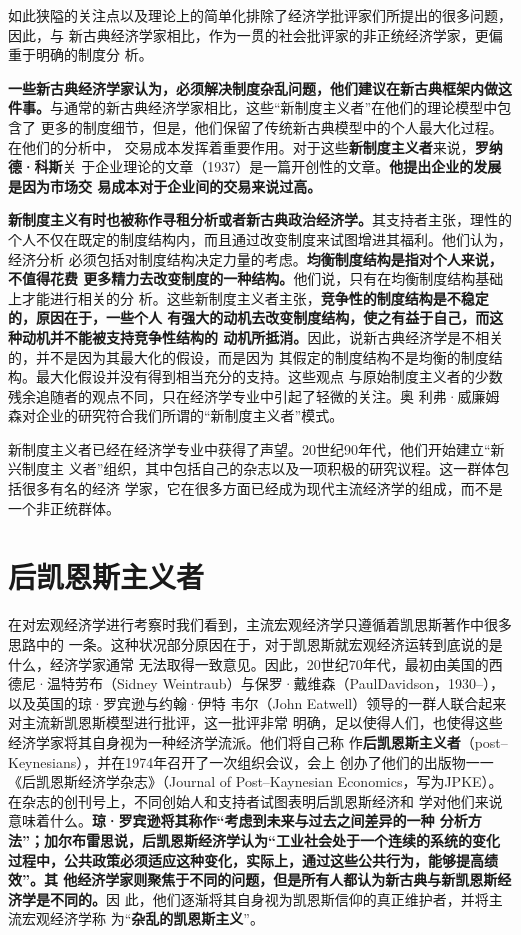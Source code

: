 如此狭隘的关注点以及理论上的简单化排除了经济学批评家们所提出的很多问题，因此，与
新古典经济学家相比，作为一贯的社会批评家的非正统经济学家，更偏重于明确的制度分
析。

\textbf{一些新古典经济学家认为，必须解决制度杂乱问题，他们建议在新古典框架内做这
  件事。}与通常的新古典经济学家相比，这些“新制度主义者”在他们的理论模型中包含了
更多的制度细节，但是，他们保留了传统新古典模型中的个人最大化过程。在他们的分析中，
交易成本发挥着重要作用。对于这些\textbf{新制度主义者}来说，\textbf{罗纳德·科斯}关
于企业理论的文章（1937）是一篇开创性的文章。\textbf{他提出企业的发展是因为市场交
  易成本对于企业间的交易来说过高。}

\textbf{新制度主义有时也被称作寻租分析或者新古典政治经济学。}其支持者主张，理性的
个人不仅在既定的制度结构内，而且通过改变制度来试图增进其福利。他们认为，经济分析
必须包括对制度结构决定力量的考虑。\textbf{均衡制度结构是指对个人来说，不值得花费
  更多精力去改变制度的一种结构。}他们说，只有在均衡制度结构基础上才能进行相关的分
析。这些新制度主义者主张，\textbf{竞争性的制度结构是不稳定的，原因在于，一些个人
  有强大的动机去改变制度结构，使之有益于自己，而这种动机并不能被支持竞争性结构的
  动机所抵消。}因此，说新古典经济学是不相关的，并不是因为其最大化的假设，而是因为
其假定的制度结构不是均衡的制度结构。最大化假设并没有得到相当充分的支持。这些观点
与原始制度主义者的少数残余追随者的观点不同，只在经济学专业中引起了轻微的关注。奥
利弗·威廉姆森对企业的研究符合我们所谓的“新制度主义者”模式。

新制度主义者已经在经济学专业中获得了声望。20世纪90年代，他们开始建立“新兴制度主
义者”组织，其中包括自己的杂志以及一项积极的研究议程。这一群体包括很多有名的经济
学家，它在很多方面已经成为现代主流经济学的组成，而不是一个非正统群体。

\section{后凯恩斯主义者}

在对宏观经济学进行考察时我们看到，主流宏观经济学只遵循着凯思斯著作中很多思路中的
一条。这种状况部分原因在于，对于凯恩斯就宏观经济运转到底说的是什么，经济学家通常
无法取得一致意见。因此，20世纪70年代，最初由美国的西德尼·温特劳布（Sidney
Weintraub）与保罗·戴维森（PaulDavidson，1930--），以及英国的琼·罗宾逊与约翰·伊特
韦尔（John Eatwell）领导的一群人联合起来对主流新凯恩斯模型进行批评，这一批评非常
明确，足以使得人们，也使得这些经济学家将其自身视为一种经济学流派。他们将自己称
作\textbf{后凯恩斯主义者}（post--Keynesians），并在1974年召开了一次组织会议，会上
创办了他们的出版物一一《后凯恩斯经济学杂志》（Journal of Post--Kaynesian
Economics，写为JPKE）。在杂志的创刊号上，不同创始人和支持者试图表明后凯恩斯经济和
学对他们来说意味着什么。\textbf{琼·罗宾逊将其称作“考虑到未来与过去之间差异的一种
  分析方法”；加尔布雷思说，后凯恩斯经济学认为“工业社会处于一个连续的系统的变化
  过程中，公共政策必须适应这种变化，实际上，通过这些公共行为，能够提高绩效”。其
  他经济学家则聚焦于不同的问题，但是所有人都认为新古典与新凯恩斯经济学是不同的。}因
此，他们逐渐将其自身视为凯恩斯信仰的真正维护者，并将主流宏观经济学称
为“\textbf{杂乱的凯恩斯主义}”。

